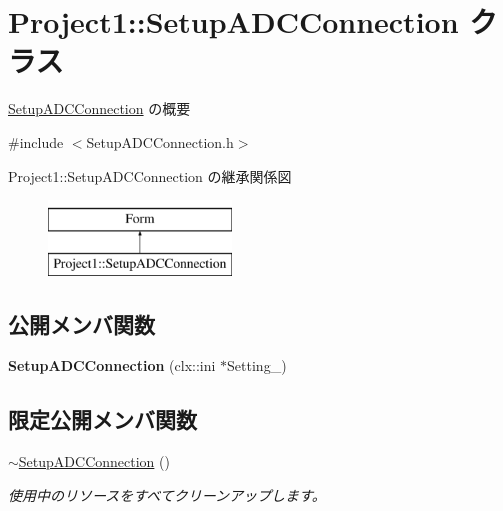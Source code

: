\hypertarget{class_project1_1_1_setup_a_d_c_connection}{}\section{Project1\+:\+:Setup\+A\+D\+C\+Connection クラス}
\label{class_project1_1_1_setup_a_d_c_connection}


\hyperlink{class_project1_1_1_setup_a_d_c_connection}{Setup\+A\+D\+C\+Connection} の概要  




{\ttfamily \#include $<$Setup\+A\+D\+C\+Connection.\+h$>$}

Project1\+:\+:Setup\+A\+D\+C\+Connection の継承関係図\begin{figure}[H]
\begin{center}
\leavevmode
\includegraphics[height=2.000000cm]{class_project1_1_1_setup_a_d_c_connection}
\end{center}
\end{figure}
\subsection*{公開メンバ関数}
\begin{DoxyCompactItemize}
\item 
\mbox{\label{class_project1_1_1_setup_a_d_c_connection_ace927052e2be7c56f451eb04559d34d6}} 
{\bfseries Setup\+A\+D\+C\+Connection} (clx\+::ini $\ast$Setting\+\_\+)
\end{DoxyCompactItemize}
\subsection*{限定公開メンバ関数}
\begin{DoxyCompactItemize}
\item 
\hyperlink{class_project1_1_1_setup_a_d_c_connection_a866e7e75c329629e9f2d18ff382a7dc4}{$\sim$\+Setup\+A\+D\+C\+Connection} ()
\begin{DoxyCompactList}\small\item\em 使用中のリソースをすべてクリーンアップします。 \end{DoxyCompactList}\end{DoxyCompactItemize}


